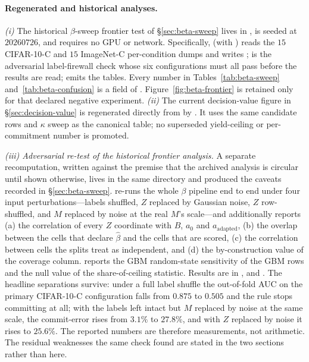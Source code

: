\paragraph{Regenerated and historical analyses.}
\emph{(i)} The historical $\beta$-sweep frontier test of \S\ref{sec:beta-sweep} lives in
, is seeded at $20260726$, and requires no GPU or
network. Specifically,
 (with ) reads the $15$ CIFAR-10-C and $15$ ImageNet-C
per-condition dumps and writes ;
 is the adversarial label-firewall check whose six configurations must all
pass before the results are read;  emits the tables. Every number in
Tables~\ref{tab:beta-sweep} and~\ref{tab:beta-confusion} is a field of
. Figure~\ref{fig:beta-frontier} is retained only for that declared
negative experiment.
\emph{(ii)} The current decision-value figure in \S\ref{sec:decision-value} is regenerated directly
from  by
. It uses the same candidate
rows and $\kappa$ sweep as the canonical table; no superseded yield-ceiling or per-commitment number
is promoted.

\emph{(iii) Adversarial re-test of the historical frontier analysis.} A separate recomputation,
written against the premise that the archived analysis is circular until shown otherwise, lives in
the same directory and produced the caveats recorded in \S\ref{sec:beta-sweep}.
 re-runs the whole $\beta$ pipeline end to end under four input
perturbations---labels shuffled, $Z$ replaced by Gaussian noise, $Z$ row-shuffled, and $M$ replaced
by noise at the real $M$'s scale---and additionally reports (a) the correlation of every $Z$
coordinate with $B$, $a_0$ and $a_{\text{adapted}}$, (b) the overlap between the cells that declare
$\widehat\beta$ and the cells that are scored, (c) the correlation between cells the splits treat as
independent, and (d) the by-construction value of the coverage column.
 reports the GBM random-state sensitivity of the GBM rows and
the null value of the share-of-ceiling statistic. Results are in
,  and
. The headline separations survive: under a full label
shuffle the out-of-fold AUC on the primary CIFAR-10-C configuration falls from $0.875$ to $0.505$
and the rule stops committing at all; with the labels left intact but $M$ replaced by noise at the
same scale, the commit-error rises from $3.1\%$ to $27.8\%$, and with $Z$ replaced by noise it rises
to $25.6\%$. The reported numbers are therefore measurements, not arithmetic. The residual
weaknesses the same check found are stated in the two sections rather than here.

